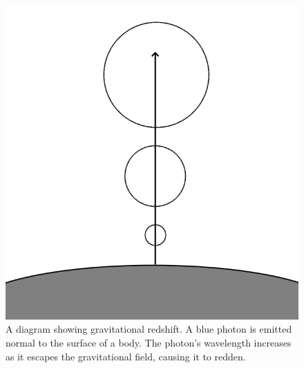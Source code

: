 \documentclass[12pt]{article}
\begin{document}
\begin{figure} 
\centering
\label{fig4}
  \includegraphics[width = 6 in]{redshift.png}
  \caption{
A diagram showing gravitational redshift.
A blue photon is emitted normal to the surface of a body.
The photon's wavelength increases as it escapes the gravitational field, causing it to redden.
}
\end{figure}
\end{document}
